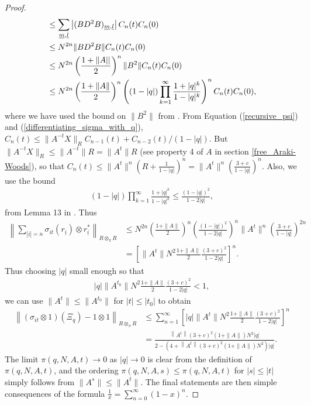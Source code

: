 \begin{proof}
\begin{align*}
			&\leq \sum_{\underline{m},\underline{l}} \left| (BD^2B)_{\underline{m},\underline{l}}\right| C_n(t)C_n(0) \\
			&\leq N^{2n} \|BD^2B\| C_n(t)C_n(0)\\
			&\leq N^{2n}\left(\frac{1+\|A||}{2}\right)^n \|B^2\| C_n(t)C_n(0) \\
			& \leq N^{2n}\left(\frac{1+\|A\|}{2}\right)^n \left( (1-|q|)\prod_{k=1}^\infty \frac{1+|q|^k}{1-|q|^k}\right)^n C_n(t)C_n(0),
	\end{align*}
where we have used the bound on $\|B^2\|$ from \cite{D}. From Equation (\ref{recursive_psi}) and (\ref{differentiating_sigma_with_q}), $C_n(t)\leq \|A^{-t}X\|_RC_{n-1}(t) +C_{n-2}(t)/(1-|q|)$. But $\|A^{-t}X\|_R\leq \|A^{-t}\| R=\|A^t\| R$ (see property 4 of $A$ in section \ref{free_Araki-Woods}), so that $C_n(t)\leq \|A^{t}\|^n\left( R+\frac{1}{1-|q|}\right)^n=\|A^{t}\|^n\left(\frac{3+c}{1-|q|}\right)^n$. Also, we use the bound
	\begin{align*}
		(1-|q|)\prod_{k=1}^\infty \frac{1+|q|^k}{1-|q|^k}\leq \frac{(1-|q|)^2}{1-2|q|},
	\end{align*}
from Lemma 13 in \cite{Shl09}. Thus
	\begin{align*}
		\left\|\sum_{|\underline{i}|=n} \sigma_{it}( r_{\underline{i}})\otimes r_{\underline{i}}^*\right\|_{R\otimes_\pi R} &\leq N^{2n}\left(\frac{1+\|A\|}{2}\right)^n \left(\frac{(1-|q|)^2}{1-2|q|}\right)^n \|A^{t}\|^n\left(\frac{3+c}{1-|q|}\right)^{2n}\\
					&= \left[ \|A^{t}\|N^2 \frac{1+\|A\|}{2}\frac{(3+c)^2}{1-2|q|}\right]^n.
	\end{align*}
Thus choosing $|q|$ small enough so that
	\begin{align*}
		|q|\|A^{t_0}\|N^2 \frac{1+\|A\|}{2}\frac{(3+c)^2}{1-2|q|}<1,
	\end{align*}
we can use $\|A^t\|\leq \|A^{t_0}\|$ for $|t|\leq|t_0|$ to obtain
	\begin{align*}
		\left\|(\sigma_{it}\otimes 1)(\Xi_q)-1\otimes 1\right\|_{R\otimes_\pi R} &\leq \sum_{n=1}^\infty \left[|q|\|A^{t}\|N^2\frac{1+\|A\|}{2}\frac{(3+c)^2}{1-2|q|}\right]^n\\
													&=\frac{\left\|A^{t}\right\|(3+c)^2(1+\|A\|)N^2|q|}{2- \left(4+ \left\|A^{t}\right\|(3+c)^2(1+\|A\|)N^2\right)|q|}.
	\end{align*}
The limit $\pi(q,N,A,t)\rightarrow 0$ as $|q|\rightarrow 0$ is clear from the definition of $\pi(q,N,A,t)$, and the ordering $\pi(q,N,A,s)\leq \pi(q,N,A,t)$ for $|s|\leq |t|$ simply follows from $\|A^s\| \leq \|A^t\|$. The final statements are then simple consequences of the formula $\frac{1}{x}=\sum_{n=0}^\infty (1-x)^n$.
\end{proof}

